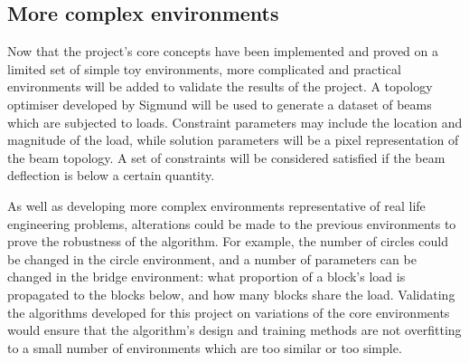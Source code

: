 \documentclass[a4paper]{article}
\begin{document}
\subsection{More complex environments}

Now that the project's core concepts have been implemented and proved on a limited set of simple toy environments,
more complicated and practical environments will be added to validate the results of the project.
A topology optimiser developed by Sigmund \cite{sigmund01} will be used to generate a dataset of beams which are subjected to loads.
Constraint parameters may include the location and magnitude of the load, while solution parameters will be a pixel representation of the beam topology.
A set of constraints will be considered satisfied if the beam deflection is below a certain quantity.

As well as developing more complex environments representative of real life engineering problems,
alterations could be made to the previous environments to prove the robustness of the algorithm.
For example, the number of circles could be changed in the circle environment, and a number of parameters can be changed in the bridge environment:
what proportion of a block's load is propagated to the blocks below, and how many blocks share the load.
Validating the algorithms developed for this project on variations of the core environments would ensure that the algorithm's design and training methods
are not overfitting to a small number of environments which are too similar or too simple.
\end{document}
